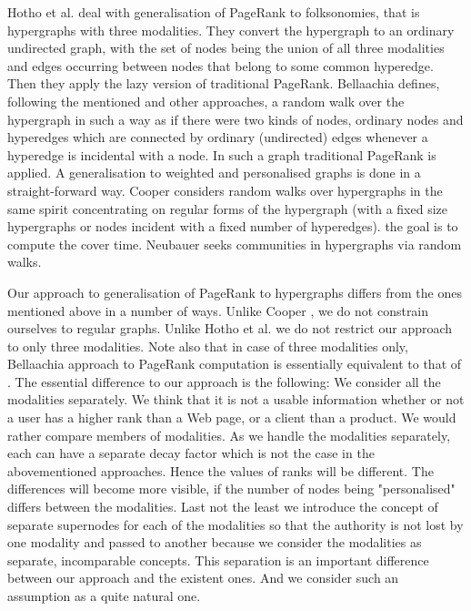 \documentclass{fundam}
\begin{document}
Hotho et al. \cite{Hotho:2006,Hotho:2006folkrank} deal with generalisation of PageRank to folksonomies, that is hypergraphs with three modalities.
They convert the hypergraph to an ordinary undirected graph,
with the set of nodes being the union of all three modalities and edges
occurring between nodes that belong to some common hyperedge.
Then they apply the lazy version of traditional PageRank.
Bellaachia \cite{Bellaachia:2013}
defines, following the mentioned and other approaches,  a random walk over the hypergraph in such a way as if there were two kinds of nodes,
ordinary nodes and hyperedges which are connected by ordinary (undirected) edges whenever a
hyperedge is incidental with a node.
In such a graph traditional PageRank is applied.
A generalisation to weighted and personalised graphs is done in a straight-forward way.
Cooper \cite{Cooper:2013}
considers random walks over hypergraphs in the same spirit
concentrating on regular forms of the hypergraph (with a fixed size hypergraphs or nodes incident with a fixed number of hyperedges).
the goal is to compute the cover time.  Neubauer
\cite{Neubauer:2009} seeks communities in   hypergraphs via random walks.

Our approach to generalisation of PageRank to hypergraphs differs from the ones mentioned above in a number of ways.
Unlike Cooper  \cite{Cooper:2013}, we do not constrain ourselves to regular graphs.
Unlike Hotho et al.  \cite{Hotho:2006,Hotho:2006folkrank} we do not restrict our approach to only three modalities.
Note also that in case of three modalities only, Bellaachia \cite{Bellaachia:2013}
approach to PageRank computation is essentially equivalent to that of
\cite{Hotho:2006,Hotho:2006folkrank}.
The essential difference to our approach is the following:
We consider all the modalities separately.
We think that it is not a usable information whether or not a user has a higher rank than a Web page, or a client than a product. We would rather compare members of modalities.
As we handle the modalities separately,   each can have a separate decay factor which is not the case in the abovementioned approaches. Hence the values of ranks will be different. The differences will become more visible, if the number of nodes being "personalised" differs between the modalities.
Last not the least we introduce the concept of separate supernodes for each of the modalities so that the authority is not lost by one modality and passed to another because we consider the modalities as separate, incomparable concepts.
This separation is an important   difference between our approach and the existent ones. And we consider such an assumption as a quite natural one.
\end{document}
